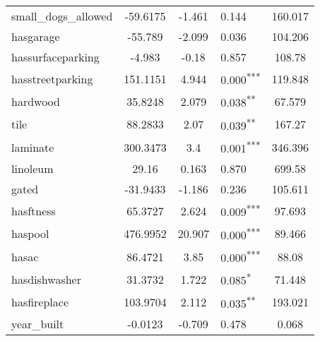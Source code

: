 \documentclass[12pt]{report}
\begin{document}
\begin{longtable}{l S[table-format=6.4] S[table-format=3.4] l S[table-format=4.4]}
	small\_dogs\_allowed         & -59.6175             & -1.461           & 0.144                      & 160.017                           \\
	hasgarage                    & -55.789              & -2.099           & 0.036                      & 104.206                           \\
	hassurfaceparking            & -4.983               & -0.18            & 0.857                      & 108.78                            \\
	hasstreetparking             & 151.1151             & 4.944            & 0.000\textsuperscript{***} & 119.848                           \\
	hardwood                     & 35.8248              & 2.079            & 0.038\textsuperscript{**}  & 67.579                            \\
	tile                         & 88.2833              & 2.07             & 0.039\textsuperscript{**}  & 167.27                            \\
	laminate                     & 300.3473             & 3.4              & 0.001\textsuperscript{***} & 346.396                           \\
	linoleum                     & 29.16                & 0.163            & 0.870                      & 699.58                            \\
	gated                        & -31.9433             & -1.186           & 0.236                      & 105.611                           \\
	hasftness                    & 65.3727              & 2.624            & 0.009\textsuperscript{***} & 97.693                            \\
	haspool                      & 476.9952             & 20.907           & 0.000\textsuperscript{***} & 89.466                            \\
	hasac                        & 86.4721              & 3.85             & 0.000\textsuperscript{***} & 88.08                             \\
	hasdishwasher                & 31.3732              & 1.722            & 0.085\textsuperscript{*}   & 71.448                            \\
	hasfireplace                 & 103.9704             & 2.112            & 0.035\textsuperscript{**}  & 193.021                           \\
	year\_built                  & -0.0123              & -0.709           & 0.478                      & 0.068                             \\

\end{longtable}
\end{document}
